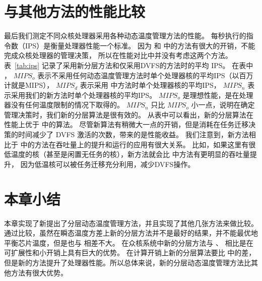  \section{与其他方法的性能比较}\label{sec:ips_comp}
 
 最后我们测定不同众核处理器采用各种动态温度管理方法的性能。
 每秒执行的指令数（IPS）是衡量处理器性能一个标准。
 因为 \cite{MaWang:APCCAS'14} 和 \cite{Hanumaiah:TCAD'11} 中的方法有很大的开销，不能完成众核处理器的管理决策，
 所以在性能对比中并没有考虑这两个方法。
 表~\ref{tab:ips} 记录了采用新分层方法和仅采用DVFS的方法时的平均 IPS。
 在表中 ， $MIPS_o$ 表示不采用任何动态温度管理方法时单个处理器核的平均IPS（以百万计就是MIPS），
 $MIPS_d$ 表示采用 \cite{Zanini:ECCTD'09} 中方法时单个处理器核的平均IPS，
 $MIPS_n$ 表示采用我们的新方法时单个处理器核的平均IPS。
 $MIPS_o$ 是理想性能，是在处理器没有任何温度限制的情况下取得的。
  $MIPS_n$ 只比  $MIPS_o$ 小一点，说明在确定管理决策时，我们新的分层算法是很有效的。
  从表中可以看出，新的分层算法在性能上优于 \cite{Zanini:ECCTD'09} 中的算法。
  尽管新算法有稍微大一点的开销，但是消耗在任务迁移决策的时间减少了 DVFS 激活的次数，带来的是性能收益。
  我们注意到，新方法相比于 \cite{Zanini:ECCTD'09} 中的方法在吞吐量上的提升和运行的应用有很大关系。
  比如，如果这里有很低温度的核（甚至是闲置无任务的核），新方法就会比 \cite{Zanini:ECCTD'09} 中方法有更明显的吞吐量提升，
  因为低温核可以被任务迁移充分利用，减少DVFS操作。
  
 \section{本章小结}\label{sec:xiaojie6}
 
 本章实现了新提出了分层动态温度管理方法，并且实现了其他几张方法来做比较。通过比较，虽然在瞬态温度方差上新的分层方法并不是最好的结果，并不能最优地平衡芯片温度，但是也与 \cite{MaWang:APCCAS'14} 相差不大。
 在众核系统中新的分层方法与 \cite{MaWang:APCCAS'14}、 \cite{Hanumaiah:TCAD'11}相比是在可扩展性和小开销上具有巨大的优势。
 在计算开销上新的分层算法要比 \cite{Zanini:ECCTD'09} 中的差，但是新的方法提升了处理器性能。所以总体来说，新的分层动态温度管理方法比其他方法有很大优势。
 
 
 
 


























